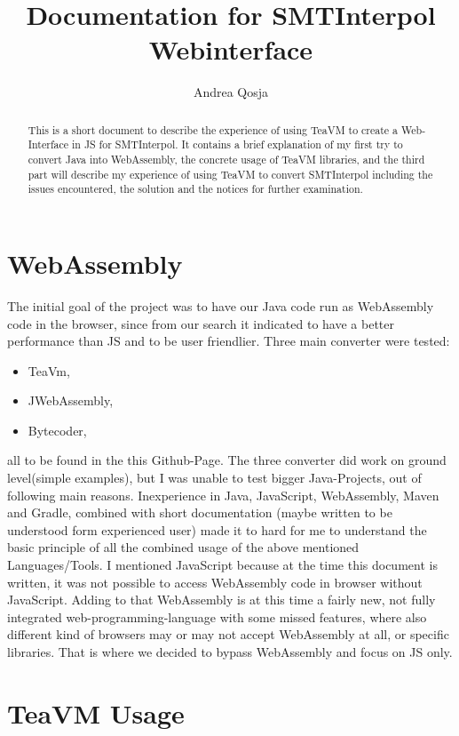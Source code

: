 \documentclass[12pt]{article}
\title{Documentation for SMTInterpol Webinterface}
\author{Andrea Qosja}
\begin{document}
\maketitle

\begin{abstract}
This is a short document to describe the experience of using TeaVM to create a Web-Interface in JS for SMTInterpol. It contains a brief explanation of my first try to convert Java into WebAssembly, the concrete usage of TeaVM libraries, and the third part will describe my experience of using TeaVM to convert SMTInterpol including the issues encountered, the solution and the notices for further examination.
\end{abstract}

\section{WebAssembly}

The initial goal of the project was to have our Java code run as WebAssembly code in the browser, since from our search it indicated to have a better performance than JS and to be user friendlier. Three main converter were tested:
\begin{itemize} 
\item[] TeaVm,
\item[] JWebAssembly,
\item[] Bytecoder,
\end{itemize}
all to be found in the this\cite{1} Github-Page.
The three converter did work on ground level(simple examples), but I was unable to test bigger Java-Projects, out of following main reasons.
Inexperience in Java, JavaScript, WebAssembly, Maven and Gradle,
combined with short documentation (maybe written to be understood form experienced user) made it to hard for me to understand the basic principle of all the combined usage of the above mentioned Languages/Tools. I mentioned JavaScript because at the time this document is written, it was not possible to access WebAssembly code in browser without JavaScript. Adding to that WebAssembly is at this time a fairly new, not fully integrated web-programming-language with some missed features, where also different kind of browsers may or may not accept WebAssembly at all, or specific libraries. That is where we decided to bypass WebAssembly and focus on JS only.

\section{TeaVM Usage}
\end{document}
